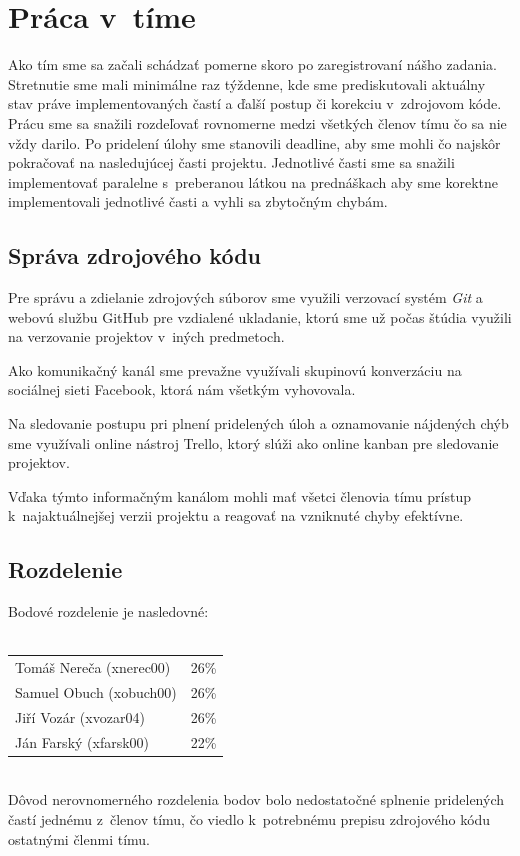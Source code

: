 \documentclass{article}
\begin{document}
    \section{Práca v~tíme}
    Ako tím sme sa začali schádzať pomerne skoro po zaregistrovaní nášho zadania. Stretnutie sme mali
    minimálne raz týždenne, kde sme prediskutovali aktuálny stav práve implementovaných častí
    a ďalší postup či korekciu v~zdrojovom kóde. Prácu sme sa snažili rozdeľovať rovnomerne medzi
    všetkých členov tímu čo sa nie vždy darilo. Po pridelení úlohy sme stanovili deadline, aby sme
    mohli čo najskôr pokračovať na nasledujúcej časti projektu. Jednotlivé časti sme sa snažili
    implementovať paralelne s~preberanou látkou na prednáškach aby sme korektne implementovali
    jednotlivé časti a vyhli sa zbytočným chybám.

        \subsection{Správa zdrojového kódu}
        Pre správu a zdielanie zdrojových súborov sme využili verzovací systém \emph{Git} a webovú službu GitHub pre vzdialené ukladanie, ktorú sme už
        počas štúdia využili na verzovanie projektov v~iných predmetoch.

        Ako komunikačný kanál sme
        prevažne využívali skupinovú konverzáciu na sociálnej sieti Facebook, ktorá nám všetkým
        vyhovovala.

        Na sledovanie postupu pri plnení pridelených úloh a oznamovanie nájdených chýb
        sme využívali online nástroj Trello, ktorý slúži ako online kanban pre sledovanie projektov.

        Vďaka týmto informačným kanálom mohli mať všetci členovia tímu prístup k~najaktuálnejšej
        verzii projektu a reagovať na vzniknuté chyby efektívne.

        \newpage
        \subsection{Rozdelenie}
        \noindent
        Bodové rozdelenie je nasledovné:\\~\\
        \begin{tabular}{l l}
            Tomáš Nereča (xnerec00) & 26\% \\
            Samuel Obuch (xobuch00) & 26\% \\
            Jiří Vozár (xvozar04)   & 26\% \\
            Ján Farský (xfarsk00)   & 22\% \\
        \end{tabular} \\
        Dôvod nerovnomerného rozdelenia bodov bolo nedostatočné splnenie pridelených častí jednému
        z~členov tímu, čo viedlo k~potrebnému prepisu zdrojového kódu ostatnými členmi tímu.
\end{document}
